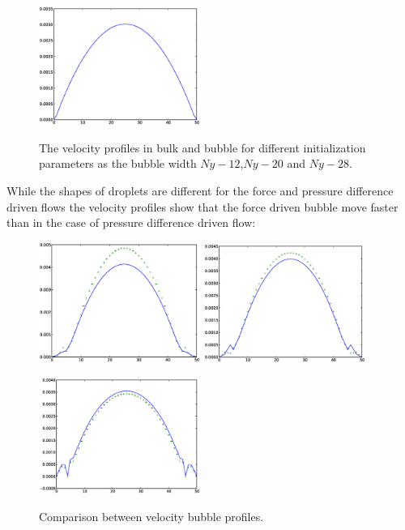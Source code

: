\documentclass{article}
\begin{document}
\begin{figure}
\hfill
\includegraphics[width=0.47\textwidth]{Figures/vel_bulk_force_width_14.eps}\\
\caption{The velocity profiles in bulk and bubble for different initialization
parameters as the
bubble width $Ny-12$,$Ny-20$ and $Ny-28$.
\label{fig:velocity:profiles:different:widths:force}}
\end{figure}

While the shapes of droplets are different for the force and pressure
difference driven flows the velocity profiles show that the force driven bubble
move faster than in the case of pressure difference driven flow:
\begin{figure}
\includegraphics[width=0.47\textwidth]{Figures/vel_comparison_width_6.eps}
\hfill
\includegraphics[width=0.47\textwidth]{Figures/vel_comparison_width_10.eps}
\\
\begin{center}
\includegraphics[width=0.47\textwidth]{Figures/vel_comparison_width_14.eps}\\
\end{center}
\caption{Comparison between velocity bubble
profiles.\label{fig:velocity:comparison:different:widths}}
\end{figure}
\end{document}
